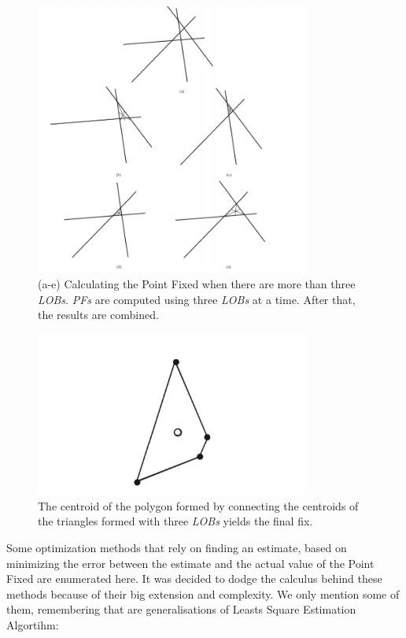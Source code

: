 \documentclass[english,purist]{ist-report}
\begin{document}
\begin{figure}[ht]
\centering
\includegraphics[width=90mm]{target8.png}
\caption{(a-e) Calculating the Point Fixed when there are more than three \textit{LOBs}. \textit{PFs} are computed using three \textit{LOBs} at a time. After that, the results are combined.}
\label{target8}
\end{figure} 



\begin{figure}[ht]
\centering
\includegraphics[width=90mm]{target9.png}
\caption{The centroid of the polygon formed by connecting the centroids of the triangles formed with three \textit{LOBs} yields the final fix.}
\label{target9}
\end{figure} 




Some optimization methods that rely on finding an estimate, based on minimizing the error between the estimate and the actual value of the Point Fixed are enumerated here. It was decided to dodge the calculus behind these methods because of their big extension and complexity. We only mention some of them, remembering that are generalisations of Leasts Square Estimation Algortihm:
\end{document}
